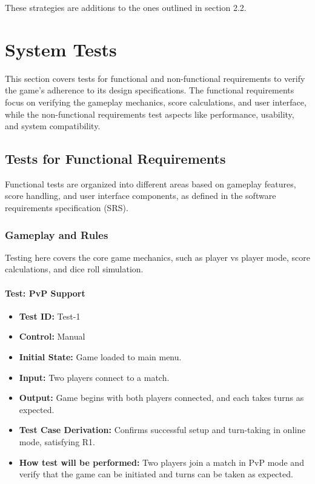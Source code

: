 \documentclass[12pt, titlepage]{article}
\begin{document}
\noindent These strategies are additions to the ones outlined in section 2.2.


\section{System Tests}

This section covers tests for functional and non-functional requirements to verify the game's adherence to its design specifications. The functional requirements focus on verifying the gameplay mechanics, score calculations, and user interface, while the non-functional requirements test aspects like performance, usability, and system compatibility.

\subsection{Tests for Functional Requirements}

Functional tests are organized into different areas based on gameplay features, score handling, and user interface components, as defined in the software requirements specification (SRS).

\subsubsection{Gameplay and Rules}

Testing here covers the core game mechanics, such as player vs player mode, score calculations, and dice roll simulation.

\paragraph{\label{test-1}Test: PvP Support}
\begin{itemize}
    \item \textbf{Test ID:} Test-1
    \item \textbf{Control:} Manual
    \item \textbf{Initial State:} Game loaded to main menu.
    \item \textbf{Input:} Two players connect to a match.
    \item \textbf{Output:} Game begins with both players connected, and each takes turns as expected.
    \item \textbf{Test Case Derivation:} Confirms successful setup and turn-taking in online mode, satisfying R1.
    \item \textbf{How test will be performed:} Two players join a match in PvP mode and verify that the game can be initiated and turns can be taken as expected.
\end{itemize}
\end{document}
